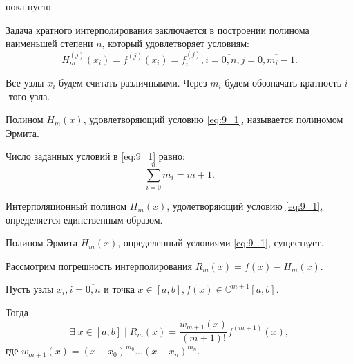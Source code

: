 \begin{col-answer-preambule}
	\begin{plan}
    \item пока пусто
	\end{plan}
\end{col-answer-preambule}


Задача кратного интерполирования заключается в построении полинома наименьшей степени $n$, который удовлетворяет условиям:
\begin{equation}\label{eq:9_1}
  H_m^{(j)}(x_i) = f^{(j)}(x_i) = f_i^{(j)}, i = \overline{0, n}, j = \overline{0, m_i - 1}.
\end{equation}

Все узлы $x_i$ будем считать различнымми. Через $m_i$ будем обозначать кратность $i$-того узла.

Полином $H_m(x)$, удовлетворяющий условию \eqref{eq:9_1}, называется полиномом Эрмита.

Число заданных условий в \eqref{eq:9_1} равно:
\begin{equation*}
  \sum\limits_{i=0}^n m_i = m + 1.
\end{equation*}

\begin{theorem}
  Интерполяционный полином $H_m(x)$, удолетворяющий условию \eqref{eq:9_1}, определяется единственным образом.
\end{theorem}

\begin{theorem}
  Полином Эрмита $H_m(x)$, определенный условиями \eqref{eq:9_1}, существует.
\end{theorem}
\vspace{5mm}

Рассмотрим погрешность интерполирования $R_m(x) = f(x) - H_m(x)$.

\begin{theorem}
  Пусть узлы $x_i, i = \overline{0, n}$ и точка $x \in [a, b], f(x) \in \mathbb{C}^{m + 1} [a, b]$.

  Тогда
  \begin{equation*}
    \exists \; \overline{x} \in [a, b] \; | \; R_m(x) = \dfrac{w_{m+1}(x)}{(m+1)!} f^{(m+1)}(\overline{x}),
  \end{equation*}
  где $w_{m+1}(x) = (x - x_0)^{m_0} \ldots (x - x_n)^{m_n}$.
\end{theorem}
\vspace{5mm}

